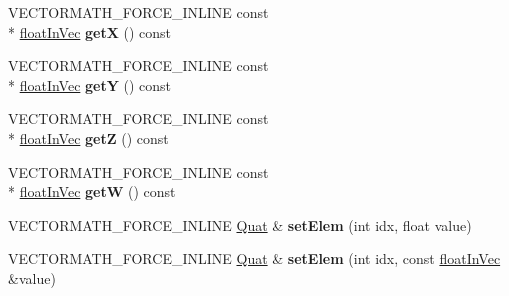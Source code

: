 \begin{DoxyCompactItemize}
\item 
\hypertarget{class_vectormath_1_1_aos_1_1_quat_a9ac7e5d2a1c1bad10e1036b8a74b3560}{V\+E\+C\+T\+O\+R\+M\+A\+T\+H\+\_\+\+F\+O\+R\+C\+E\+\_\+\+I\+N\+L\+I\+N\+E const \\*
\hyperlink{class_vectormath_1_1float_in_vec}{float\+In\+Vec} {\bfseries get\+X} () const }\label{class_vectormath_1_1_aos_1_1_quat_a9ac7e5d2a1c1bad10e1036b8a74b3560}

\item 
\hypertarget{class_vectormath_1_1_aos_1_1_quat_a9e5a0865c4f2ece0d2ad679dba880424}{V\+E\+C\+T\+O\+R\+M\+A\+T\+H\+\_\+\+F\+O\+R\+C\+E\+\_\+\+I\+N\+L\+I\+N\+E const \\*
\hyperlink{class_vectormath_1_1float_in_vec}{float\+In\+Vec} {\bfseries get\+Y} () const }\label{class_vectormath_1_1_aos_1_1_quat_a9e5a0865c4f2ece0d2ad679dba880424}

\item 
\hypertarget{class_vectormath_1_1_aos_1_1_quat_a0542cbada96c2f58ac4a5ca8fe73a356}{V\+E\+C\+T\+O\+R\+M\+A\+T\+H\+\_\+\+F\+O\+R\+C\+E\+\_\+\+I\+N\+L\+I\+N\+E const \\*
\hyperlink{class_vectormath_1_1float_in_vec}{float\+In\+Vec} {\bfseries get\+Z} () const }\label{class_vectormath_1_1_aos_1_1_quat_a0542cbada96c2f58ac4a5ca8fe73a356}

\item 
\hypertarget{class_vectormath_1_1_aos_1_1_quat_ab508d45adeafad3d5a70671ecfd2d00d}{V\+E\+C\+T\+O\+R\+M\+A\+T\+H\+\_\+\+F\+O\+R\+C\+E\+\_\+\+I\+N\+L\+I\+N\+E const \\*
\hyperlink{class_vectormath_1_1float_in_vec}{float\+In\+Vec} {\bfseries get\+W} () const }\label{class_vectormath_1_1_aos_1_1_quat_ab508d45adeafad3d5a70671ecfd2d00d}

\item 
\hypertarget{class_vectormath_1_1_aos_1_1_quat_afd13fc9c366143b07fb28215bcf0ee64}{V\+E\+C\+T\+O\+R\+M\+A\+T\+H\+\_\+\+F\+O\+R\+C\+E\+\_\+\+I\+N\+L\+I\+N\+E \hyperlink{class_vectormath_1_1_aos_1_1_quat}{Quat} \& {\bfseries set\+Elem} (int idx, float value)}\label{class_vectormath_1_1_aos_1_1_quat_afd13fc9c366143b07fb28215bcf0ee64}

\item 
\hypertarget{class_vectormath_1_1_aos_1_1_quat_ae1944f695987bc1e79bf67d5c80f60c3}{V\+E\+C\+T\+O\+R\+M\+A\+T\+H\+\_\+\+F\+O\+R\+C\+E\+\_\+\+I\+N\+L\+I\+N\+E \hyperlink{class_vectormath_1_1_aos_1_1_quat}{Quat} \& {\bfseries set\+Elem} (int idx, const \hyperlink{class_vectormath_1_1float_in_vec}{float\+In\+Vec} \&value)}\label{class_vectormath_1_1_aos_1_1_quat_ae1944f695987bc1e79bf67d5c80f60c3}


\end{DoxyCompactItemize}
